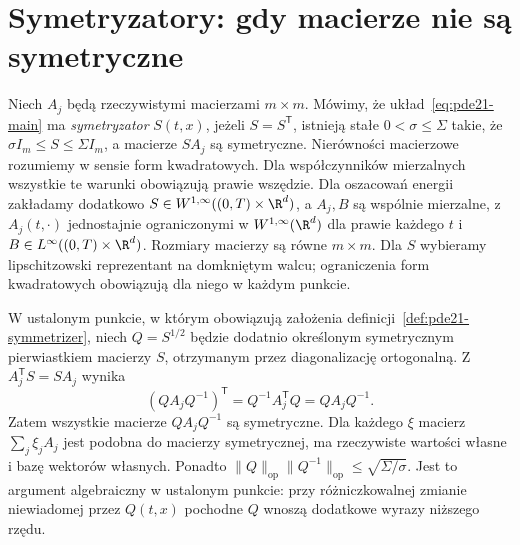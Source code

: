 \section{Symetryzatory: gdy macierze nie są symetryczne}
\begin{definicja}\label{def:pde21-symmetrizer}
Niech $A_j$ będą rzeczywistymi macierzami $m\times m$.
Mówimy, że układ~\eqref{eq:pde21-main} ma \emph{symetryzator} $S(t,x)$,
jeżeli $S=S^\mathsf T$, istnieją stałe $0<\sigma\le\Sigma$ takie,
że $\sigma I_m\le S\le\Sigma I_m$, a macierze $SA_j$ są symetryczne.
Nierówności macierzowe rozumiemy w sensie form
kwadratowych. Dla współczynników mierzalnych wszystkie
te warunki obowiązują prawie wszędzie.
Dla oszacowań energii zakładamy dodatkowo
$S\in W^{1,\infty}((0,T)\times\R^d)$,
a $A_j,B$ są wspólnie mierzalne, z $A_j(t,\cdot)$
jednostajnie ograniczonymi w $W^{1,\infty}(\R^d)$
dla prawie każdego $t$
i $B\in L^\infty((0,T)\times\R^d)$.
Rozmiary macierzy są równe $m\times m$.
Dla $S$ wybieramy lipschitzowski reprezentant
na domkniętym walcu; ograniczenia form kwadratowych
obowiązują dla niego w każdym punkcie.
\end{definicja}

\begin{uwaga}
W ustalonym punkcie, w którym obowiązują założenia
definicji~\ref{def:pde21-symmetrizer}, niech $Q=S^{1/2}$
będzie dodatnio określonym symetrycznym pierwiastkiem
macierzy $S$, otrzymanym przez diagonalizację ortogonalną.
Z $A_j^\mathsf TS=SA_j$ wynika
\[
 (QA_jQ^{-1})^\mathsf T
 =Q^{-1}A_j^\mathsf TQ=QA_jQ^{-1}.
\]
Zatem wszystkie macierze $QA_jQ^{-1}$ są symetryczne.
Dla każdego $\xi$ macierz $\sum_j\xi_jA_j$ jest
podobna do macierzy symetrycznej, ma rzeczywiste
wartości własne i bazę wektorów własnych.
Ponadto $\|Q\|_{\mathrm{op}}\|Q^{-1}\|_{\mathrm{op}}
\le\sqrt{\Sigma/\sigma}$.
Jest to argument algebraiczny w ustalonym punkcie:
przy różniczkowalnej zmianie niewiadomej przez
$Q(t,x)$ pochodne $Q$ wnoszą dodatkowe wyrazy
niższego rzędu.
\end{uwaga}

